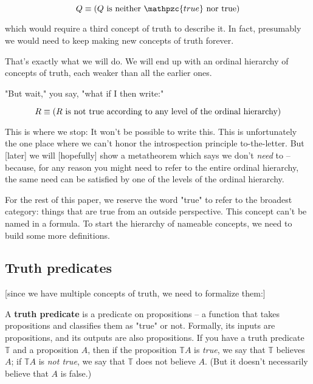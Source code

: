 \documentclass{article}
\begin{document}
  \begin{equation*}
    Q \equiv (Q \mathrm{\ is\ neither\ }\mathpzc{true}\mathrm{\ nor\ true})\\
  \end{equation*}
  
  which would require a third concept of truth to describe it.
  In fact, presumably we would need to keep making new concepts of truth forever.
  
  That's exactly what we will do. We will end up with an ordinal hierarchy of concepts of truth, each weaker than all the earlier ones.
  
  "But wait," you say, "what if I then write:"
  
  \begin{equation*}
    R \equiv (R \text{ is not true according to any level of the ordinal hierarchy})\\
  \end{equation*}
  
  This is where we stop: It won't be possible to write this. This is unfortunately the one place where we can't honor the introspection principle to-the-letter. But [later] we will [hopefully] show a metatheorem which says we don't \emph{need} to – because, for any reason you might need to refer to the entire ordinal hierarchy, the same need can be satisfied by one of the levels of the ordinal hierarchy.

  For the rest of this paper, we reserve the word "true" to refer to the broadest category: things that are true from an outside perspective. This concept can't be named in a formula. To start the hierarchy of nameable concepts, we need to build some more definitions.

  \subsection{Truth predicates}
  
  [since we have multiple concepts of truth, we need to formalize them:]
  
  A \textbf{truth predicate} is a predicate on propositions – a function that takes propositions and classifies them as "true" or not. Formally, its inputs are propositions, and its outputs are also propositions. If you have a truth predicate $\mathbb{T}$ and a proposition $A$, then if the proposition $\mathbb{T} A$ is \emph{true}, we say that $\mathbb{T}$ believes $A$; if $\mathbb{T} A$ is \emph{not true}, we say that $\mathbb{T}$ does not believe $A$. (But it doesn't necessarily believe that $A$ is false.)
  
\end{document}
